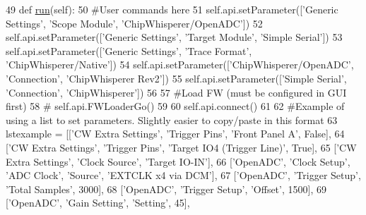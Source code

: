 \begin{DoxyCode}
49     \textcolor{keyword}{def }\hyperlink{classsoftware_1_1chipwhisperer_1_1capture_1_1scripts_1_1cwrev2-simpleserial_1_1UserScript_a154f0a4d19996434fef7c17f78bfc8f9}{run}(self):
50         \textcolor{comment}{#User commands here}
51         self.api.setParameter([\textcolor{stringliteral}{'Generic Settings'}, \textcolor{stringliteral}{'Scope Module'}, \textcolor{stringliteral}{'ChipWhisperer/OpenADC'}])
52         self.api.setParameter([\textcolor{stringliteral}{'Generic Settings'}, \textcolor{stringliteral}{'Target Module'}, \textcolor{stringliteral}{'Simple Serial'}])
53         self.api.setParameter([\textcolor{stringliteral}{'Generic Settings'}, \textcolor{stringliteral}{'Trace Format'}, \textcolor{stringliteral}{'ChipWhisperer/Native'}])
54         self.api.setParameter([\textcolor{stringliteral}{'ChipWhisperer/OpenADC'}, \textcolor{stringliteral}{'Connection'}, \textcolor{stringliteral}{'ChipWhisperer Rev2'}])
55         self.api.setParameter([\textcolor{stringliteral}{'Simple Serial'}, \textcolor{stringliteral}{'Connection'}, \textcolor{stringliteral}{'ChipWhisperer'}])
56 
57         \textcolor{comment}{#Load FW (must be configured in GUI first)}
58         \textcolor{comment}{# self.api.FWLoaderGo()}
59                 
60         self.api.connect()
61 
62         \textcolor{comment}{#Example of using a list to set parameters. Slightly easier to copy/paste in this format}
63         lstexample = [[\textcolor{stringliteral}{'CW Extra Settings'}, \textcolor{stringliteral}{'Trigger Pins'}, \textcolor{stringliteral}{'Front Panel A'}, \textcolor{keyword}{False}],
64                       [\textcolor{stringliteral}{'CW Extra Settings'}, \textcolor{stringliteral}{'Trigger Pins'}, \textcolor{stringliteral}{'Target IO4 (Trigger Line)'}, \textcolor{keyword}{True}],
65                       [\textcolor{stringliteral}{'CW Extra Settings'}, \textcolor{stringliteral}{'Clock Source'}, \textcolor{stringliteral}{'Target IO-IN'}],
66                       [\textcolor{stringliteral}{'OpenADC'}, \textcolor{stringliteral}{'Clock Setup'}, \textcolor{stringliteral}{'ADC Clock'}, \textcolor{stringliteral}{'Source'}, \textcolor{stringliteral}{'EXTCLK x4 via DCM'}],
67                       [\textcolor{stringliteral}{'OpenADC'}, \textcolor{stringliteral}{'Trigger Setup'}, \textcolor{stringliteral}{'Total Samples'}, 3000],
68                       [\textcolor{stringliteral}{'OpenADC'}, \textcolor{stringliteral}{'Trigger Setup'}, \textcolor{stringliteral}{'Offset'}, 1500],
69                       [\textcolor{stringliteral}{'OpenADC'}, \textcolor{stringliteral}{'Gain Setting'}, \textcolor{stringliteral}{'Setting'}, 45],

\end{DoxyCode}
